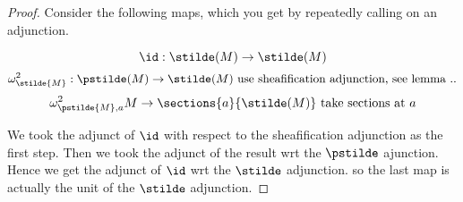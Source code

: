 
\begin{proof}
Consider the following maps, which you get by repeatedly calling on an adjunction.

\[\id :\stilde(M) \rightarrow \stilde(M)\]
\[\omega^2_{\stilde{M}} : \pstilde(M) \rightarrow \stilde(M) 
	\mbox{ use sheafification adjunction, see lemma ..}
\]
\[\omega^2_{\pstilde{M},a} M \rightarrow \sections{a}{\stilde(M)} \mbox{ take sections at $a$}\]

We took the adjunct of $\id$ with respect to the sheafification adjunction as the first step.
Then we took the adjunct of the result wrt the $\pstilde$ ajunction.
Hence we get the adjunct of $\id$ wrt the $\stilde$ adjunction.
so the last map is actually the unit of the $\stilde$ adjunction.
\end{proof}

